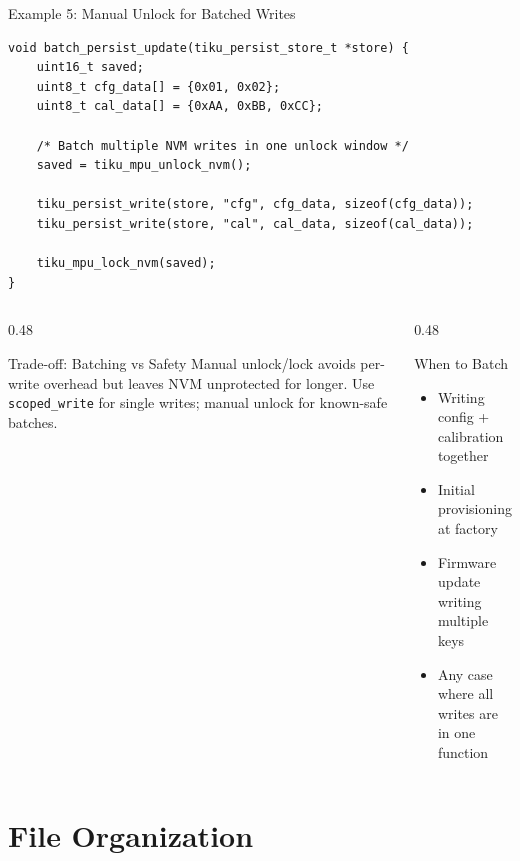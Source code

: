 \documentclass[aspectratio=169, 10pt]{beamer}
\begin{document}
\begin{frame}[fragile]{Example 5: Manual Unlock for Batched Writes}
\begin{lstlisting}[style=cstyle]
void batch_persist_update(tiku_persist_store_t *store) {
    uint16_t saved;
    uint8_t cfg_data[] = {0x01, 0x02};
    uint8_t cal_data[] = {0xAA, 0xBB, 0xCC};

    /* Batch multiple NVM writes in one unlock window */
    saved = tiku_mpu_unlock_nvm();

    tiku_persist_write(store, "cfg", cfg_data, sizeof(cfg_data));
    tiku_persist_write(store, "cal", cal_data, sizeof(cal_data));

    tiku_mpu_lock_nvm(saved);
}
\end{lstlisting}

\vspace{0.3em}
\begin{columns}[T]
\begin{column}{0.48\textwidth}
\begin{alertblock}{Trade-off: Batching vs Safety}
Manual unlock/lock avoids per-write overhead but
leaves NVM unprotected for longer. Use
\texttt{scoped\_write} for single writes; manual
unlock for known-safe batches.
\end{alertblock}
\end{column}
\begin{column}{0.48\textwidth}
\begin{block}{When to Batch}
\begin{itemize}
  \item Writing config + calibration together
  \item Initial provisioning at factory
  \item Firmware update writing multiple keys
  \item Any case where all writes are in one function
\end{itemize}
\end{block}
\end{column}
\end{columns}
\end{frame}

\section{File Organization}
\end{document}
